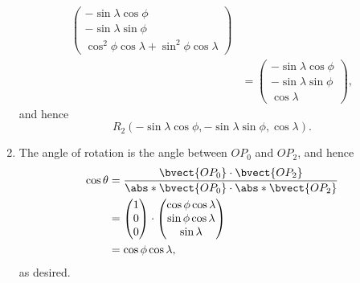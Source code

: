 \begin{enumerate}
\begin{align*}
\begin{pmatrix}
                                     - \sin \lambda \cos \phi  \\
                                     -  \sin \lambda \sin \phi \\
                                     \cos^2 \phi \cos \lambda  + \sin^2 \phi \cos \lambda
                                 \end{pmatrix}                            \\
                             & = \begin{pmatrix}
                                     - \sin \lambda \cos \phi  \\
                                     -  \sin \lambda \sin \phi \\
                                     \cos \lambda
                                 \end{pmatrix},
          \end{align*}
          and hence
          \[
              R_2 (- \sin \lambda \cos \phi, - \sin \lambda \sin \phi, \cos \lambda).
          \]

    \item The angle of rotation is the angle between \(O P_0\) and \(O P_2\), and hence
          \begin{align*}
              \cos \theta & = \frac{\bvect{O P_0} \cdot \bvect{O P_2}}{\abs*{\bvect{O P_0}} \cdot \abs*{\bvect{O P_2}}} \\
                          & = \begin{pmatrix}
                                  1 \\
                                  0 \\
                                  0
                              \end{pmatrix} \cdot \begin{pmatrix}
                                                      \cos \phi \cos \lambda \\
                                                      \sin \phi \cos \lambda \\
                                                      \sin \lambda
                                                  \end{pmatrix}                                                \\
                          & = \cos \phi \cos \lambda,
          \end{align*}
          as desired.


\end{enumerate}
